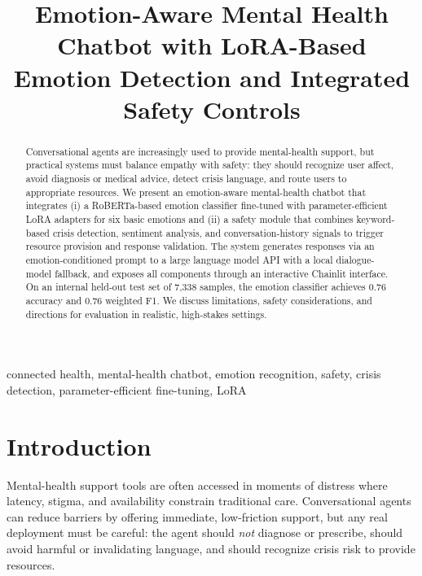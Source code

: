 \documentclass[conference]{IEEEtran}
\newif\ifreview
\begin{document}
\title{Emotion-Aware Mental Health Chatbot with LoRA-Based Emotion Detection and Integrated Safety Controls}

\ifreview
\author{
  \IEEEauthorblockN{Anonymous Author(s)}
  \IEEEauthorblockA{Submitted for double-blind review to IEEE/ACM CHASE 2026}
}
\else
\author{}
\fi

\maketitle

\begin{abstract}
Conversational agents are increasingly used to provide mental-health support, but practical systems must balance empathy with safety: they should recognize user affect, avoid diagnosis or medical advice, detect crisis language, and route users to appropriate resources. We present an emotion-aware mental-health chatbot that integrates (i) a RoBERTa-based emotion classifier fine-tuned with parameter-efficient LoRA adapters for six basic emotions and (ii) a safety module that combines keyword-based crisis detection, sentiment analysis, and conversation-history signals to trigger resource provision and response validation. The system generates responses via an emotion-conditioned prompt to a large language model API with a local dialogue-model fallback, and exposes all components through an interactive Chainlit interface. On an internal held-out test set of 7{,}338 samples, the emotion classifier achieves 0.76 accuracy and 0.76 weighted F1. We discuss limitations, safety considerations, and directions for evaluation in realistic, high-stakes settings.
\end{abstract}

\begin{IEEEkeywords}
connected health, mental-health chatbot, emotion recognition, safety, crisis detection, parameter-efficient fine-tuning, LoRA
\end{IEEEkeywords}

\section{Introduction}
Mental-health support tools are often accessed in moments of distress where latency, stigma, and availability constrain traditional care. Conversational agents can reduce barriers by offering immediate, low-friction support, but any real deployment must be careful: the agent should \emph{not} diagnose or prescribe, should avoid harmful or invalidating language, and should recognize crisis risk to provide resources.
\end{document}
